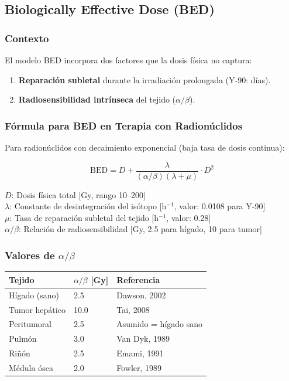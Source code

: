\documentclass[12pt,a4paper]{article}
\newcommand{\vardef}[2]{\noindent\textbf{#1}: #2\\}
\begin{document}
\subsection{Biologically Effective Dose (BED)}

\subsubsection{Contexto}

El modelo BED incorpora dos factores que la dosis física no captura:
\begin{enumerate}
  \item \textbf{Reparación subletal} durante la irradiación prolongada (Y-90: días).
  \item \textbf{Radiosensibilidad intrínseca} del tejido ($\alpha/\beta$).
\end{enumerate}

\subsubsection{Fórmula para BED en Terapia con Radionúclidos}

Para radionúclidos con decaimiento exponencial (baja tasa de dosis continua):

$$\text{BED} = D + \frac{\lambda}{(\alpha/\beta)(\lambda + \mu)} \cdot D^2$$

\vardef{$D$}{Dosis física total [Gy, rango 10--200]}
\vardef{$\lambda$}{Constante de desintegración del isótopo [h$^{-1}$, valor: 0.0108 para Y-90]}
\vardef{$\mu$}{Tasa de reparación subletal del tejido [h$^{-1}$, valor: 0.28]}
\vardef{$\alpha/\beta$}{Relación de radiosensibilidad [Gy, 2.5 para hígado, 10 para tumor]}

\subsubsection{Valores de $\alpha/\beta$}

\begin{tabular}{p{4cm} p{3cm} p{5cm}}
\toprule
\textbf{Tejido} & $\alpha/\beta$ [Gy] & \textbf{Referencia} \\
\midrule
Hígado (sano) & 2.5 & Dawson, 2002 \\
Tumor hepático & 10.0 & Tai, 2008 \\
Peritumoral & 2.5 & Asumido = hígado sano \\
Pulmón & 3.0 & Van Dyk, 1989 \\
Riñón & 2.5 & Emami, 1991 \\
Médula ósea & 2.0 & Fowler, 1989 \\
\bottomrule
\end{tabular}
\end{document}
